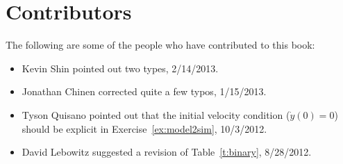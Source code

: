 \chapter{Contributors}
The following are some of the people who have contributed to this book:
\begin{itemize}
\item Kevin Shin pointed out two types, 2/14/2013.
\item Jonathan Chinen corrected quite a few typos, 1/15/2013.
\item Tyson Quisano pointed out that the initial velocity condition ($\dot{y}(0)=0$) should be explicit in Exercise~\ref{ex:model2sim}, 10/3/2012.
\item David Lebowitz suggested a revision of Table~\ref{t:binary}, 8/28/2012.
\end{itemize}

